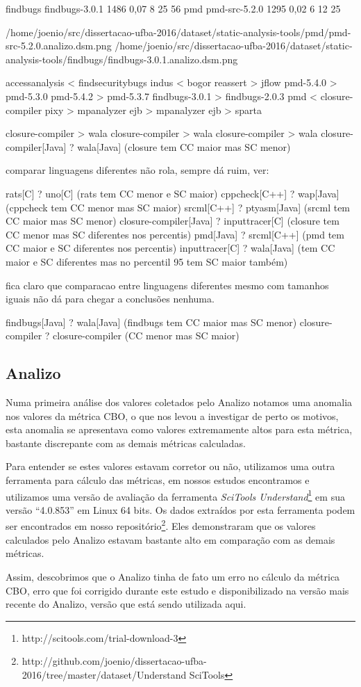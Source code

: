 findbugs	 findbugs-3.0.1	1486	0,07	8	25	56
pmd	 pmd-src-5.2.0	1295	0,02	6	12	25

/home/joenio/src/dissertacao-ufba-2016/dataset/static-analysis-tools/pmd/pmd-src-5.2.0.analizo.dsm.png
/home/joenio/src/dissertacao-ufba-2016/dataset/static-analysis-tools/findbugs/findbugs-3.0.1.analizo.dsm.png

accessanalysis < findsecuritybugs
indus < bogor
reassert > jflow
pmd-5.4.0 > pmd-5.3.0
pmd-5.4.2 > pmd-5.3.7
findbugs-3.0.1 > findbugs-2.0.3
pmd < closure-compiler
pixy > mpanalyzer
ejb > mpanalyzer
ejb > sparta

closure-compiler > wala
closure-compiler > wala
closure-compiler > wala
closure-compiler[Java] ? wala[Java]     (closure tem CC maior mas SC menor)

comparar linguagens diferentes não rola, sempre dá ruim, ver:

rats[C]        ? uno[C]                 (rats tem CC menor e SC maior)
cppcheck[C++]  ? wap[Java]              (cppcheck tem CC menor mas SC maior)
srcml[C++]     ? ptyasm[Java]           (srcml tem CC maior mas SC menor)
closure-compiler[Java] ? inputtracer[C] (closure tem CC menor mas SC diferentes nos percentis)
pmd[Java] ? srcml[C++]                  (pmd tem CC maior e SC diferentes nos percentis)
inputtracer[C] ? wala[Java]             (tem CC maior e SC diferentes mas no percentil 95 tem SC maior também)

fica claro que comparacao entre linguagens diferentes mesmo com tamanhos iguais não dá para chegar a conclusões nenhuma.

findbugs[Java] ? wala[Java]             (findbugs tem CC maior mas SC menor)
closure-compiler ? closure-compiler     (CC menor mas SC maior)

\subsection{Analizo}

Numa primeira análise dos valores coletados pelo Analizo notamos uma anomalia
nos valores da métrica CBO, o que nos levou a investigar de perto os motivos,
esta anomalia se apresentava como valores extremamente altos para esta métrica,
bastante discrepante com as demais métricas calculadas.

Para entender se estes valores estavam corretor ou não, utilizamos uma outra
ferramenta para cálculo das métricas, em nossos estudos encontramos e
utilizamos uma versão de avaliação da ferramenta {\it SciTools
Understand}\footnote{http://scitools.com/trial-download-3} em sua versão
``4.0.853'' em Linux 64 bits. Os dados extraídos por esta ferramenta podem ser
encontrados em nosso
repositório\footnote{http://github.com/joenio/dissertacao-ufba-2016/tree/master/dataset/Understand
SciTools}. Eles demonstraram que os valores calculados pelo Analizo estavam
bastante alto em comparação com as demais métricas.

Assim, descobrimos que o Analizo tinha de fato um erro no cálculo da métrica
CBO, erro que foi corrigido durante este estudo e disponibilizado na versão
mais recente do Analizo, versão que está sendo utilizada aqui.
